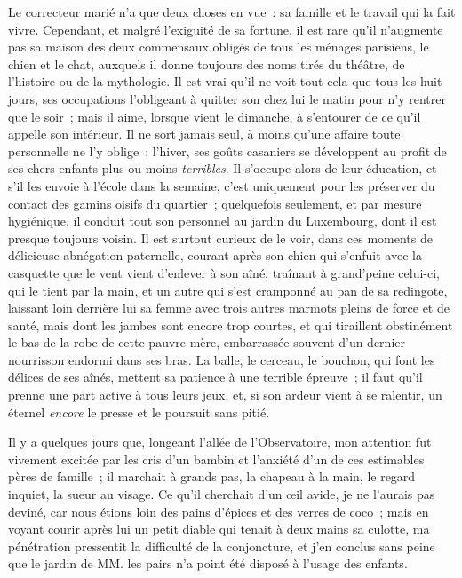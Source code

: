 \documentclass[french,twoside]{book} %
\begin{document}
Le correcteur marié n’a que deux choses en vue : sa famille et le travail qui la fait vivre. Cependant, et malgré l’exiguité de sa fortune, il est rare qu’il n’augmente pas sa maison des deux commensaux obligés de tous les ménages parisiens, le chien et le chat, auxquels il donne toujours des noms tirés du théâtre, de l’histoire ou de la mythologie. Il est vrai qu’il ne voit tout cela que tous les huit jours, ses occupations l’obligeant à quitter son chez lui le matin  pour n’y rentrer que le soir ; mais il aime, lorsque vient le dimanche, à s’entourer de ce qu’il appelle son intérieur. Il ne sort jamais seul, à moins qu’une affaire toute personnelle ne l’y oblige ; l’hiver, ses goûts casaniers se développent au profit de ses chers enfants plus ou moins \emph{terribles}. Il s’occupe alors de leur éducation, et s’il les envoie à l’école dans la semaine, c’est uniquement pour les préserver du contact des gamins oisifs du quartier ; quelquefois seulement, et par mesure hygiénique, il conduit tout son personnel au jardin du Luxembourg, dont il est presque toujours voisin. Il est surtout curieux de le voir, dans ces moments de délicieuse abnégation paternelle, courant après son chien qui s’enfuit avec la casquette que le vent vient d’enlever à son aîné, traînant à grand’peine celui-ci, qui le tient par la main, et un autre qui s’est cramponné au pan de sa redingote,  laissant loin derrière lui sa femme avec trois autres marmots pleins de force et de santé, mais dont les jambes sont encore trop courtes, et qui tiraillent obstinément le bas de la robe de cette pauvre mère, embarrassée souvent d’un dernier nourrisson endormi dans ses bras. La balle, le cerceau, le bouchon, qui font les délices de ses aînés, mettent sa patience à une terrible épreuve ; il faut qu’il prenne une part active à tous leurs jeux, et, si son ardeur vient à se ralentir, un éternel \emph{encore} le presse et le poursuit sans pitié.\par
Il y a quelques jours que, longeant l’allée de l’Observatoire, mon attention fut vivement excitée par les cris d’un bambin et l’anxiété d’un de ces estimables pères de famille ; il marchait à grands pas, la chapeau à la main, le regard inquiet, la sueur au visage. Ce qu’il cherchait d’un œil avide, je ne l’aurais pas deviné, car  nous étions loin des pains d’épices et des verres de coco ; mais en voyant courir après lui un petit diable qui tenait à deux mains sa culotte, ma pénétration pressentit la difficulté de la conjoncture, et j’en conclus sans peine que le jardin de MM. les pairs n’a point été disposé à l’usage des enfants.\par
\end{document}
